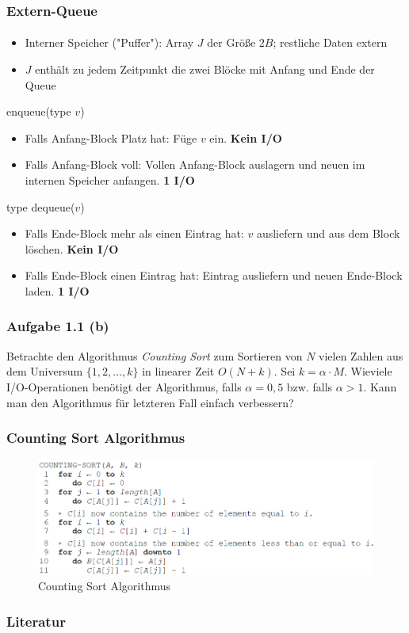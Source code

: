 \documentclass{beamer}
\begin{document}
\begin{frame}
  \frametitle{Extern-Queue}
  \framesubtitle{}
  \begin{itemize}[<+->]
    \item Interner Speicher ("Puffer"): Array $J$ der Größe $2B$; restliche Daten extern
    \item $J$ enthält zu jedem Zeitpunkt die zwei Blöcke mit Anfang und Ende der Queue
  \end{itemize}

  enqueue(type $v$)
  \begin{itemize}[<+->]
    \item Falls Anfang-Block Platz hat: Füge $v$ ein. \bf{Kein I/O}
    \item Falls Anfang-Block voll: Vollen Anfang-Block auslagern und neuen im internen Speicher anfangen. \bf{1 I/O}
  \end{itemize}

  type dequeue($v$)
  \begin{itemize}[<+->]
    \item Falls Ende-Block mehr als einen Eintrag hat: $v$ ausliefern und aus dem Block löschen. \bf{Kein I/O}
    \item Falls Ende-Block einen Eintrag hat: Eintrag ausliefern und neuen Ende-Block laden. \bf{1 I/O}
  \end{itemize}
\end{frame}



\begin{frame}
  \frametitle{Aufgabe 1.1 (b)}

  Betrachte den Algorithmus \emph{Counting Sort} zum Sortieren von $N$ vielen Zahlen aus dem Universum $\{1,2,\dots{},k\}$ in linearer Zeit $O(N+k)$. 
  Sei $k = \alpha \cdot M$.
  Wieviele I/O-Operationen benötigt der Algorithmus, falls $\alpha = 0,5$ bzw. falls $\alpha > 1$.
  Kann man den Algorithmus für letzteren Fall einfach verbessern?
\end{frame}

\begin{frame}
  \frametitle{Counting Sort Algorithmus}
  \begin{figure}[htb]
    \centering
    \includegraphics[width=1.1\textwidth]{img/counting-sort}
    \caption{Counting Sort Algorithmus \cite{CormenLeisersonRivestStein200107}} %
  \end{figure}
\end{frame}

\begin{frame}
  \frametitle{Literatur}

  
  
\end{frame}
\end{document}
